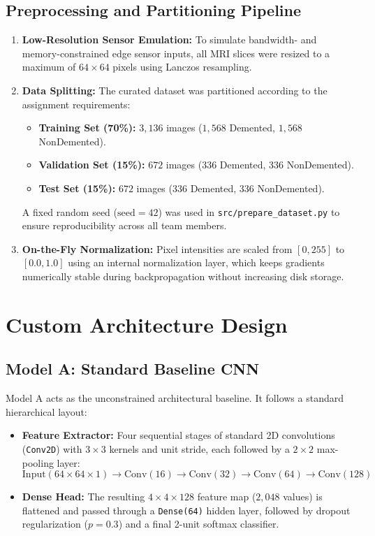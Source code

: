 \documentclass[11pt]{article}
\begin{document}
	\subsection{Preprocessing and Partitioning Pipeline}
	\begin{enumerate}
		\item \textbf{Low-Resolution Sensor Emulation:} To simulate bandwidth- and memory-constrained edge sensor inputs, all MRI slices were resized to a maximum of $64 \times 64$ pixels using Lanczos resampling.
		\item \textbf{Data Splitting:} The curated dataset was partitioned according to the assignment requirements:
		\begin{itemize}
			\item \textbf{Training Set (70\%):} $3,136$ images ($1,568$ Demented, $1,568$ NonDemented).
			\item \textbf{Validation Set (15\%):} $672$ images ($336$ Demented, $336$ NonDemented).
			\item \textbf{Test Set (15\%):} $672$ images ($336$ Demented, $336$ NonDemented).
		\end{itemize}
		A fixed random seed ($\text{seed}=42$) was used in \texttt{src/prepare\_dataset.py} to ensure reproducibility across all team members.
		\item \textbf{On-the-Fly Normalization:} Pixel intensities are scaled from $[0, 255]$ to $[0.0, 1.0]$ using an internal normalization layer, which keeps gradients numerically stable during backpropagation without increasing disk storage.
	\end{enumerate}

	\section{Custom Architecture Design}
	\subsection{Model A: Standard Baseline CNN}
	Model A acts as the unconstrained architectural baseline. It follows a standard hierarchical layout:
	\begin{itemize}
		\item \textbf{Feature Extractor:} Four sequential stages of standard 2D convolutions (\texttt{Conv2D}) with $3 \times 3$ kernels and unit stride, each followed by a $2 \times 2$ max-pooling layer:
		$$\text{Input}(64 \times 64 \times 1) \to \text{Conv}(16) \to \text{Conv}(32) \to \text{Conv}(64) \to \text{Conv}(128)$$
		\item \textbf{Dense Head:} The resulting $4 \times 4 \times 128$ feature map ($2,048$ values) is flattened and passed through a \texttt{Dense(64)} hidden layer, followed by dropout regularization ($p=0.3$) and a final 2-unit softmax classifier.
	\end{itemize}
\end{document}

